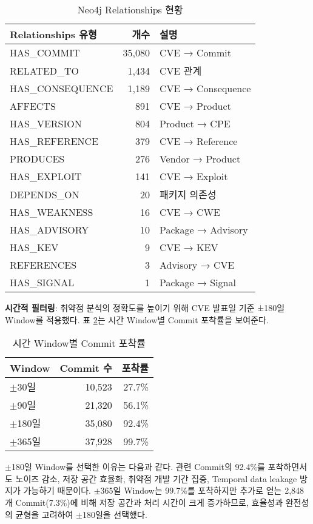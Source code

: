 ﻿\documentclass[conference]{IEEEtran}
\begin{document}
\begin{table}[h]
\centering
\caption{Neo4j Relationships 현황}
\label{tab:neo4j_relationships}
\begin{tabular}{lrl}
\toprule
\textbf{Relationships 유형} & \textbf{개수} & \textbf{설명} \\
\midrule
HAS\_COMMIT & 35,080 & CVE → Commit \\
RELATED\_TO & 1,434 & CVE 관계 \\
HAS\_CONSEQUENCE & 1,189 & CVE → Consequence \\
AFFECTS & 891 & CVE → Product \\
HAS\_VERSION & 804 & Product → CPE \\
HAS\_REFERENCE & 379 & CVE → Reference \\
PRODUCES & 276 & Vendor → Product \\
HAS\_EXPLOIT & 141 & CVE → Exploit \\
DEPENDS\_ON & 20 & 패키지 의존성 \\
HAS\_WEAKNESS & 16 & CVE → CWE \\
HAS\_ADVISORY & 10 & Package → Advisory \\
HAS\_KEV & 9 & CVE → KEV \\
REFERENCES & 3 & Advisory → CVE \\
HAS\_SIGNAL & 1 & Package → Signal \\
\bottomrule
\end{tabular}
\end{table}

\textbf{시간적 필터링}: 취약점 분석의 정확도를 높이기 위해 CVE 발표일 기준 ±180일 Window를 적용했다. 표 \ref{tab:time_window}는 시간 Window별 Commit 포착률을 보여준다.

\begin{table}[h]
\centering
\caption{시간 Window별 Commit 포착률}
\label{tab:time_window}
\begin{tabular}{lrr}
\toprule
\textbf{Window} & \textbf{Commit 수} & \textbf{포착률} \\
\midrule
$\pm$30일 & 10,523 & 27.7\% \\
$\pm$90일 & 21,320 & 56.1\% \\
$\pm$180일 & 35,080 & 92.4\% \\
$\pm$365일 & 37,928 & 99.7\% \\
\bottomrule
\end{tabular}
\end{table}

$\pm$180일 Window를 선택한 이유는 다음과 같다. 관련 Commit의 92.4\%를 포착하면서도 노이즈 감소, 저장 공간 효율화, 취약점 개발 기간 집중, Temporal data leakage 방지가 가능하기 때문이다. $\pm$365일 Window는 99.7\%를 포착하지만 추가로 얻는 2,848개 Commit(7.3\%)에 비해 저장 공간과 처리 시간이 크게 증가하므로, 효율성과 완전성의 균형을 고려하여 $\pm$180일을 선택했다.
\end{document}
